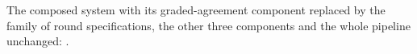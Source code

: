 \begin{definition}
  \label{def:aba-hybrid}
  \leanok
  The composed system with its graded-agreement component replaced by the family of round specifications, the other three components and the whole pipeline unchanged: .
\end{definition}
